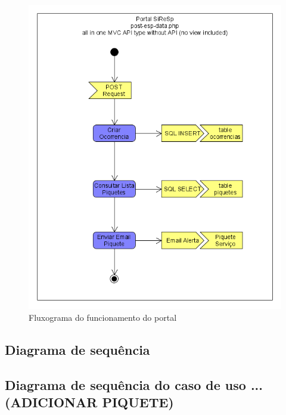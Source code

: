 \begin{figure}[!htb]
	\centering
	\includegraphics[width=\textwidth]{figuras/fluxograma_portal.png}
	\caption{Fluxograma do funcionamento do portal}
	\label{fig:fluxograma_portal}
\end{figure}

\subsection{Diagrama de sequência}

\subsection{Diagrama de sequência do caso de uso ...(ADICIONAR PIQUETE)}



